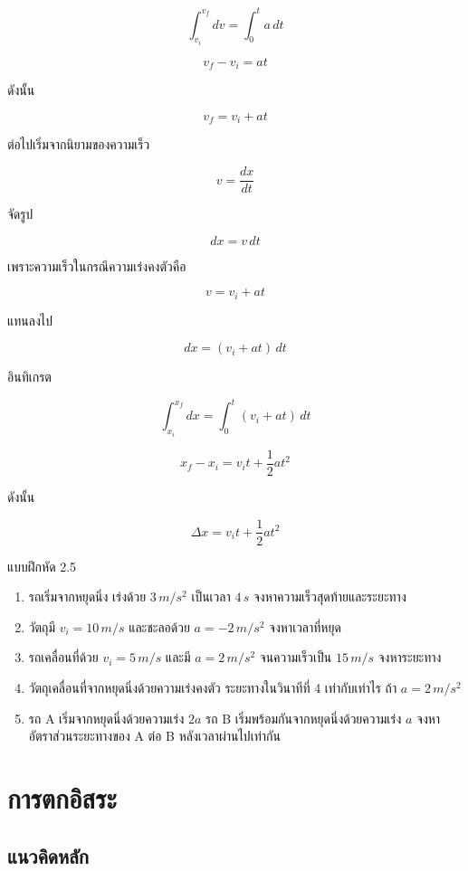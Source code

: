 \documentclass[12pt,a4paper]{report}
\begin{document}
\[
\int_{v_i}^{v_f}dv=\int_0^t a\,dt
\]

\[
v_f-v_i=at
\]

ดังนั้น

\[
v_f=v_i+at
\]

ต่อไปเริ่มจากนิยามของความเร็ว

\[
v=\frac{dx}{dt}
\]

จัดรูป

\[
dx=v\,dt
\]

เพราะความเร็วในกรณีความเร่งคงตัวคือ

\[
v=v_i+at
\]

แทนลงไป

\[
dx=(v_i+at)\,dt
\]

อินทิเกรต

\[
\int_{x_i}^{x_f}dx=\int_0^t (v_i+at)\,dt
\]

\[
x_f-x_i=v_it+\frac{1}{2}at^2
\]

ดังนั้น

\[
\Delta x=v_it+\frac{1}{2}at^2
\]

\begin{exercisebox}{แบบฝึกหัด 2.5}
\begin{enumerate}
    \item รถเริ่มจากหยุดนิ่ง เร่งด้วย $3\,\si{m/s^2}$ เป็นเวลา $4\,\si{s}$ จงหาความเร็วสุดท้ายและระยะทาง
    \item วัตถุมี $v_i=10\,\si{m/s}$ และชะลอด้วย $a=-2\,\si{m/s^2}$ จงหาเวลาที่หยุด
    \item รถเคลื่อนที่ด้วย $v_i=5\,\si{m/s}$ และมี $a=2\,\si{m/s^2}$ จนความเร็วเป็น $15\,\si{m/s}$ จงหาระยะทาง
    \item วัตถุเคลื่อนที่จากหยุดนิ่งด้วยความเร่งคงตัว ระยะทางในวินาทีที่ 4 เท่ากับเท่าไร ถ้า $a=2\,\si{m/s^2}$
    \item รถ A เริ่มจากหยุดนิ่งด้วยความเร่ง $2a$ รถ B เริ่มพร้อมกันจากหยุดนิ่งด้วยความเร่ง $a$ จงหาอัตราส่วนระยะทางของ A ต่อ B หลังเวลาผ่านไปเท่ากัน
\end{enumerate}
\end{exercisebox}

\section{การตกอิสระ}

\subsection{แนวคิดหลัก}
\end{document}
